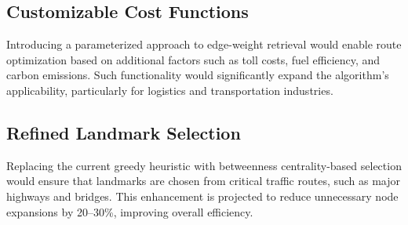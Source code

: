 \subsection{Customizable Cost Functions}
Introducing a parameterized approach to edge-weight retrieval would enable route optimization based on additional factors such as toll costs, fuel efficiency, and carbon emissions. Such functionality would significantly expand the algorithm’s applicability, particularly for logistics and transportation industries.

\subsection{Refined Landmark Selection}
Replacing the current greedy heuristic with betweenness centrality-based selection would ensure that landmarks are chosen from critical traffic routes, such as major highways and bridges. This enhancement is projected to reduce unnecessary node expansions by 20–30\%, improving overall efficiency.